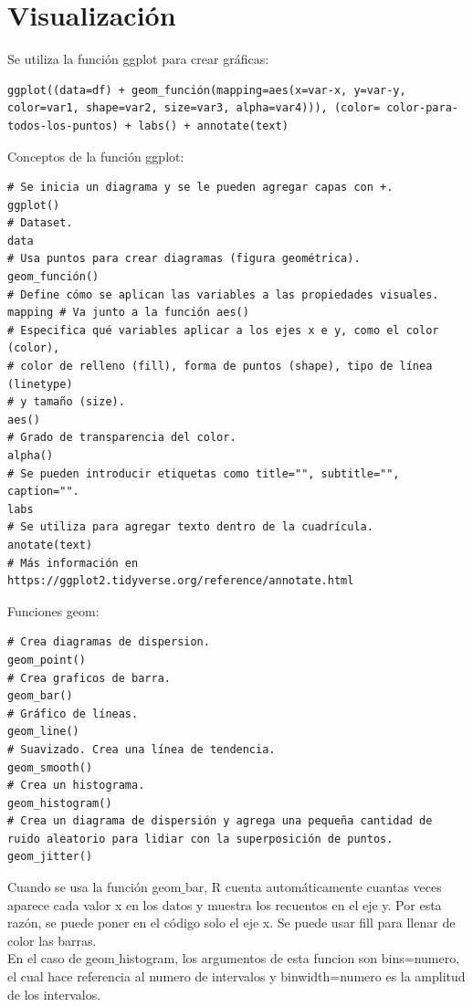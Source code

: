 \documentclass[a4paper, 12pt]{book}
\begin{document}
\section{Visualización}
Se utiliza la función ggplot para crear gráficas:
\begin{verbatim}
ggplot((data=df) + geom_función(mapping=aes(x=var-x, y=var-y, color=var1, shape=var2, size=var3, alpha=var4))), (color= color-para-todos-los-puntos) + labs() + annotate(text)
\end{verbatim}


Conceptos de la función ggplot:
\begin{verbatim}
# Se inicia un diagrama y se le pueden agregar capas con +.
ggplot()
# Dataset.
data
# Usa puntos para crear diagramas (figura geométrica).
geom_función()
# Define cómo se aplican las variables a las propiedades visuales.
mapping # Va junto a la función aes()
# Especifica qué variables aplicar a los ejes x e y, como el color (color),
# color de relleno (fill), forma de puntos (shape), tipo de línea (linetype)
# y tamaño (size).
aes()
# Grado de transparencia del color.
alpha()
# Se pueden introducir etiquetas como title="", subtitle="", caption="".
labs
# Se utiliza para agregar texto dentro de la cuadrícula.
anotate(text)
# Más información en https://ggplot2.tidyverse.org/reference/annotate.html
\end{verbatim}


Funciones geom:
\begin{verbatim}
# Crea diagramas de dispersion.
geom_point()
# Crea graficos de barra.
geom_bar()
# Gráfico de líneas.
geom_line()
# Suavizado. Crea una línea de tendencia.
geom_smooth()
# Crea un histograma.
geom_histogram()
# Crea un diagrama de dispersión y agrega una pequeña cantidad de ruido aleatorio para lidiar con la superposición de puntos.
geom_jitter()
\end{verbatim}
Cuando se usa la función geom$\_$bar, R cuenta automáticamente cuantas veces aparece cada valor x en los datos y muestra los recuentos en el eje y. Por esta razón, se puede poner en el código solo el eje x. Se puede usar fill para llenar de color las barras. \\
En el caso de geom$\_$histogram, los argumentos de esta funcion son bins=numero, el cual hace referencia al numero de intervalos y binwidth=numero es la amplitud de los intervalos.
\end{document}
